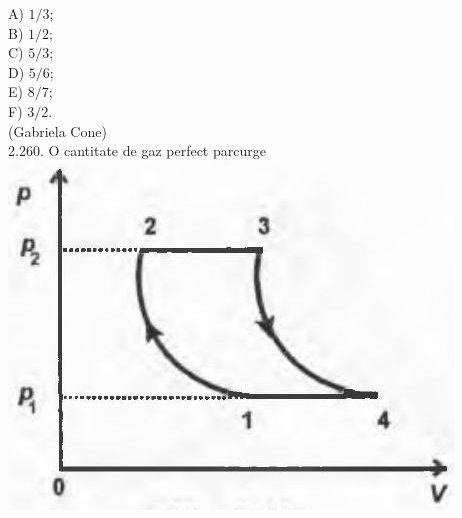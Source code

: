 \documentclass[10pt]{article}
\begin{document}
A) $1 / 3$;\\
B) $1 / 2$;\\
C) $5 / 3$;\\
D) $5 / 6$;\\
E) $8 / 7$;\\
F) $3 / 2$.\\
(Gabriela Cone)\\
2.260. O cantitate de gaz perfect parcurge\\
\includegraphics[max width=\textwidth, center]{2025_07_01_5b3ff9fa0d508c8e9f17g-132}
\end{document}
